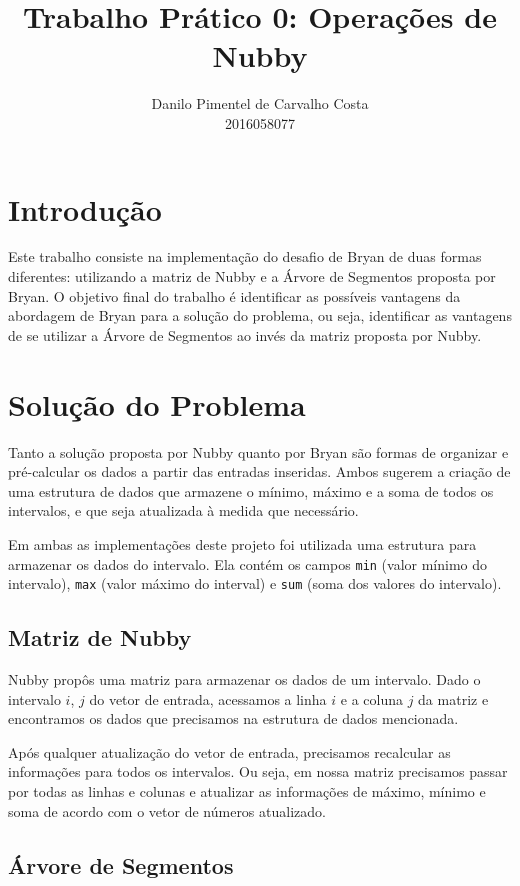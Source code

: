 \documentclass{article}
\title{Trabalho Prático 0: Operações de Nubby}
\author{Danilo Pimentel de Carvalho Costa\\2016058077}
\date{}
\begin{document}
\maketitle

\section{Introdução}

Este trabalho consiste na implementação do desafio de Bryan de duas formas diferentes: utilizando a matriz de Nubby e a Árvore de Segmentos proposta por Bryan. O objetivo final do trabalho é identificar as possíveis vantagens da abordagem de Bryan para a solução do problema, ou seja, identificar as vantagens de se utilizar a Árvore de Segmentos ao invés da matriz proposta por Nubby.

\section{Solução do Problema}

Tanto a solução proposta por Nubby quanto por Bryan são formas de organizar e pré-calcular os dados a partir das entradas inseridas. Ambos sugerem a criação de uma estrutura de dados que armazene o mínimo, máximo e a soma de todos os intervalos, e que seja atualizada à medida que necessário.

Em ambas as implementações deste projeto foi utilizada uma estrutura para armazenar os dados do intervalo. Ela contém os campos \texttt{min} (valor mínimo do intervalo), \texttt{max} (valor máximo do interval) e \texttt{sum} (soma dos valores do intervalo).

\subsection{Matriz de Nubby}

Nubby propôs uma matriz para armazenar os dados de um intervalo. Dado o intervalo $i$, $j$ do vetor de entrada, acessamos a linha $i$ e a coluna $j$ da matriz e encontramos os dados que precisamos na estrutura de dados mencionada.

Após qualquer atualização do vetor de entrada, precisamos recalcular as informações para todos os intervalos. Ou seja, em nossa matriz precisamos passar por todas as linhas e colunas e atualizar as informações de máximo, mínimo e soma de acordo com o vetor de números atualizado.

\subsection{Árvore de Segmentos}
\end{document}

